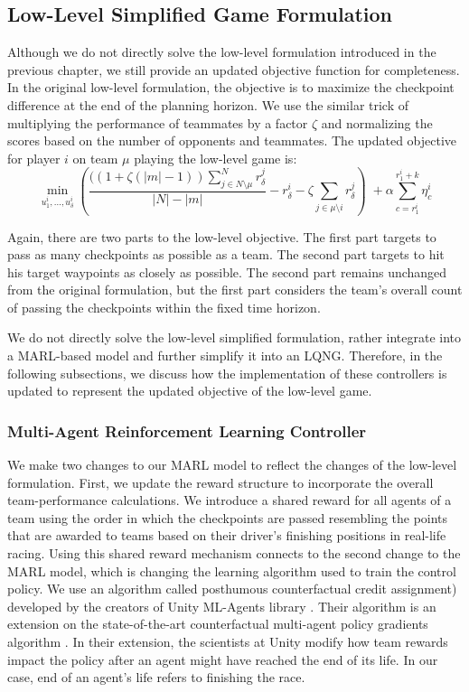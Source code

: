 \subsection{Low-Level Simplified Game Formulation}
Although we do not directly solve the low-level formulation introduced in the previous chapter, we still provide an updated objective function for completeness. In the original low-level formulation, the objective is to maximize the checkpoint difference at the end of the planning horizon. We use the similar trick of multiplying the performance of teammates by a factor $\zeta$ and normalizing the scores based on the number of opponents and teammates. The updated objective for player $i$ on team $\mu$ playing the low-level game is:
\begin{equation} \label{eq:ll_team_obj}
    \min_{u^i_{1}, ..., u^i_{\delta}} (\frac{((1+\zeta(|m|-1))\sum^N_{j \in N\setminus \mu}r^j_{\delta}}{|N|-|m|} -  r^i_{\delta} - \zeta\sum_{j \in \mu \setminus i}r^j_\delta) \; +  
    \alpha \sum_{c={r^i_{1}}}^{{r^i_{1}}+k} \eta^i_c
\end{equation}

Again, there are two parts to the low-level objective. The first part targets to pass as many checkpoints as possible as a team. The second part targets to hit his target waypoints as closely as possible. The second part remains unchanged from the original formulation, but the first part considers the team's overall count of passing the checkpoints within the fixed time horizon. 

We do not directly solve the low-level simplified formulation, rather integrate into a MARL-based model and further simplify it into an LQNG. Therefore, in the following subsections, we discuss how the implementation of these controllers is updated to represent the updated objective of the low-level game.

\subsubsection{Multi-Agent Reinforcement Learning Controller}
We make two changes to our MARL model to reflect the changes of the low-level formulation. First, we update the reward structure to incorporate the overall team-performance calculations. We introduce a shared reward for all agents of a team using the order in which the checkpoints are passed resembling the points that are awarded to teams based on their driver's finishing positions in real-life racing. Using this shared reward mechanism connects to the second change to the MARL model, which is changing the learning algorithm used to train the control policy. We use an algorithm called posthumous counterfactual credit assignment) developed by the creators of Unity ML-Agents library \cite{poca}. Their algorithm is an extension on the state-of-the-art counterfactual multi-agent policy gradients algorithm \cite{coma}. In their extension, the scientists at Unity modify how team rewards impact the policy after an agent might have reached the end of its life. In our case, end of an agent's life refers to finishing the race. 

